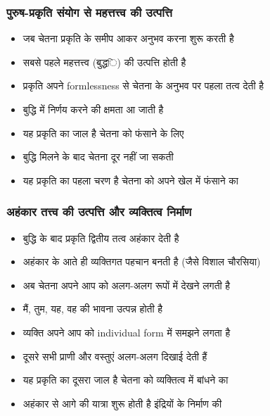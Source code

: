 \begin{frame}[fragile]\frametitle{पुरुष-प्रकृति संयोग से महत्तत्त्व की उत्पत्ति}
      \begin{itemize}
          \item जब चेतना प्रकृति के समीप आकर अनुभव करना शुरू करती है
          \item सबसे पहले महत्तत्त्व (बुद्धি) की उत्पत्ति होती है
          \item प्रकृति अपने formlessness से चेतना के अनुभव पर पहला तत्व देती है
          \item बुद्धि में निर्णय करने की क्षमता आ जाती है
          \item यह प्रकृति का जाल है चेतना को फंसाने के लिए
          \item बुद्धि मिलने के बाद चेतना दूर नहीं जा सकती
          \item यह प्रकृति का पहला चरण है चेतना को अपने खेल में फंसाने का
      \end{itemize}
\end{frame}

\begin{frame}[fragile]\frametitle{अहंकार तत्त्व की उत्पत्ति और व्यक्तित्व निर्माण}
      \begin{itemize}
          \item बुद्धि के बाद प्रकृति द्वितीय तत्व अहंकार देती है
          \item अहंकार के आते ही व्यक्तिगत पहचान बनती है (जैसे विशाल चौरसिया)
          \item अब चेतना अपने आप को अलग-अलग रूपों में देखने लगती है
          \item मैं, तुम, यह, वह की भावना उत्पन्न होती है
          \item व्यक्ति अपने आप को individual form में समझने लगता है
          \item दूसरे सभी प्राणी और वस्तुएं अलग-अलग दिखाई देती हैं
          \item यह प्रकृति का दूसरा जाल है चेतना को व्यक्तित्व में बांधने का
          \item अहंकार से आगे की यात्रा शुरू होती है इंद्रियों के निर्माण की
      \end{itemize}
\end{frame}

